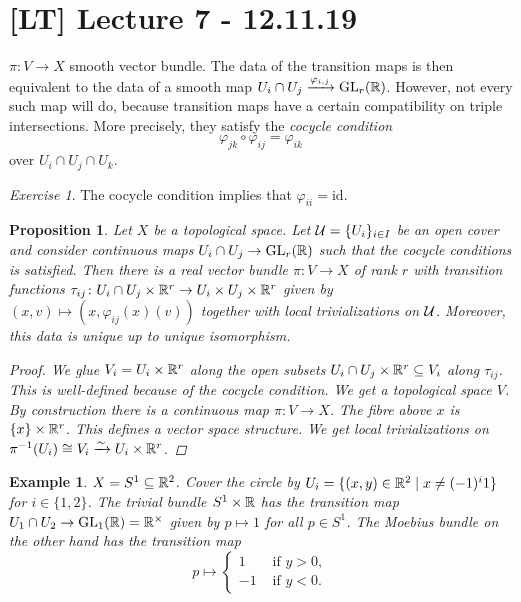 \documentclass[A4paper, british, reqno]{amsart}
\theoremstyle{darkgreentheorem}
\newtheorem{prop}[thm]{Proposition}
\theoremstyle{darkbluedefinition}
\theoremstyle{darkredexample}
\newtheorem{exa}[thm]{Example}
\theoremstyle{remark}
\newtheorem{exe}[thm]{Exercise}
\DeclareMathOperator{\GL}{GL}
\newcommand{\1}{\mathbbm{1}}
\newcommand{\id}{\mathrm{id}}
\newcommand{\tms}{\times}
\newcommand{\sub}{\subseteq}
\begin{document}
\section{[LT] Lecture 7 - 12.11.19}

$\pi\colon V\to X$ smooth vector bundle.
The data of the transition maps is then equivalent to the data of a smooth map $U_{i}\cap U_{j}\xrightarrow{\varphi_{i,j}}\GL_{r}(\R)$.
However, not every such map will do, because transition maps have a certain compatibility on triple intersections.
More precisely, they satisfy the \textit{cocycle condition}
\[ \varphi_{jk}\circ \varphi_{ij}=\varphi_{ik} \]
over $U_{i}\cap U_{j}\cap U_{k}$.

\begin{exe}
    The cocycle condition implies that $\varphi_{ii}=\id$.
\end{exe}

\begin{prop}
    Let $X$ be a topological space.
    Let $\mathcal{U}=\{U_{i}\}_{i\in I}$ be an open cover and consider continuous maps $U_{i}\cap U_{j}\to \GL_{r}(\R)$ such that the cocycle conditions is satisfied.
    Then there is a real vector bundle $\pi\colon V\to X$ of rank $r$ with transition functions $\tau_{ij}\colon U_{i}\cap U_{j}\tms \R^{r}\to U_{i}\times U_{j}\tms \R^{r}$ given by $(x,v)\mapsto (x,\varphi_{ij}(x)(v))$ together with local trivializations on $\mathcal{U}$.
    Moreover, this data is unique up to unique isomorphism.
    \begin{proof}
	We glue $V_{i}=U_{i}\times \mathbb{R}^{r}$ along the open subsets $U_{i}\cap U_{j}\tms \R^{r}\sub V_{i}$ along $\tau_{ij}$.
	This is well-defined because of the cocycle condition.
	We get a topological space $V$.
	By construction there is a continuous map $\pi\colon V\to X$.
	The fibre above $x$ is $\{x\}\tms \R^{r}$.
	This defines a vector space structure.
	We get local trivializations on $\pi^{-1}(U_{i})\cong V_{i}\xrightarrow{\sim}U_{i}\tms \R^{r}$.
    \end{proof}
\end{prop}

\begin{exa}
    $X=S^{1}\sub \R^{2}$.
    Cover the circle by $U_{i}=\{(x,y)\in \mathbb{R}^{2}\mid x\neq (-1)^{i}1\}$ for $i\in \{1,2\}$.
    The trivial bundle $S^{1}\tms \R$ has the transition map $U_{1}\cap U_{2}\to \GL_{1}(\R)=\R^{\tms}$ given by $p\mapsto 1$ for all $p\in S^{1}$.
    The Moebius bundle on the other hand has the transition map
    \[ p\mapsto \begin{cases} 1 &\text{ if } y>0, \\ -1 &\text{ if } y<0.\end{cases} \]
\end{exa}
\end{document}
